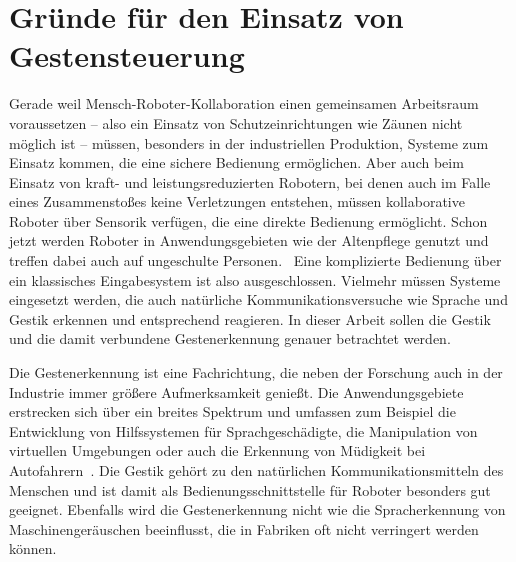 \section{Gründe für den Einsatz von Gestensteuerung}
Gerade weil Mensch-Roboter-Kollaboration einen gemeinsamen Arbeitsraum voraussetzen -- also ein Einsatz von Schutzeinrichtungen wie Zäunen nicht möglich ist -- müssen, besonders in der industriellen Produktion, Systeme zum Einsatz kommen, die eine sichere Bedienung ermöglichen. Aber auch beim Einsatz von kraft- und leistungsreduzierten Robotern, bei denen auch im Falle eines Zusammenstoßes keine Verletzungen entstehen, müssen kollaborative Roboter über Sensorik verfügen, die eine direkte Bedienung ermöglicht. Schon jetzt werden Roboter in Anwendungsgebieten wie der Altenpflege genutzt und treffen dabei auch auf ungeschulte Personen.~\cite{fraunhoferMRK} Eine komplizierte Bedienung über ein klassisches Eingabesystem ist also ausgeschlossen. Vielmehr müssen Systeme eingesetzt werden, die auch natürliche Kommunikationsversuche wie Sprache und Gestik erkennen und entsprechend reagieren. In dieser Arbeit sollen die Gestik und die damit verbundene Gestenerkennung genauer betrachtet werden.

Die Gestenerkennung ist eine Fachrichtung, die neben der Forschung auch in der Industrie immer größere Aufmerksamkeit genießt. Die Anwendungsgebiete erstrecken sich über ein breites Spektrum und umfassen zum Beispiel die Entwicklung von Hilfssystemen für Sprachgeschädigte, die Manipulation von virtuellen Umgebungen oder auch die Erkennung von Müdigkeit bei Autofahrern~\cite{recognitionSurvey}. Die Gestik gehört zu den natürlichen Kommunikationsmitteln des Menschen und ist damit als Bedienungsschnittstelle für Roboter besonders gut geeignet. Ebenfalls wird die Gestenerkennung nicht wie die Spracherkennung von Maschinengeräuschen beeinflusst, die in Fabriken oft nicht verringert werden können.